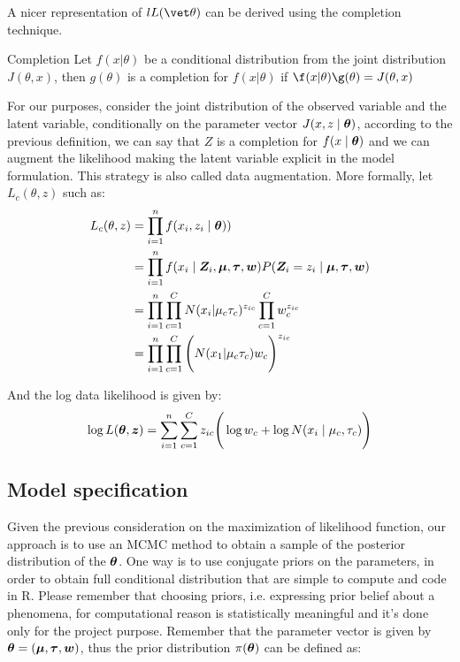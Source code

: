 \documentclass{article}
\begin{document}
A nicer representation of $l L(\vet \theta)$ can be derived using the completion technique.
\theoremstyle{definition}
\begin{definition}{Completion}
Let $f(x | \theta)$ be a conditional distribution from the joint distribution $J(\theta, x)$, then $g(\theta)$ is a completion for $f(x |\theta)$ if $\f(x|\theta) \g(\theta) = J(\theta,x)$
\end{definition}
For our purposes, consider the joint distribution of the observed variable and the latent variable, conditionally on the parameter vector $J(x, z \mid \boldsymbol{\theta})$, according to the previous definition, we can say that $Z$ is a completion for $f(x \mid \boldsymbol{\theta})$ and we can augment the likelihood making the latent variable explicit in the model formulation. This strategy is also called data augmentation. More formally, let $L_c(\theta, z)$ such as:
\begin{equation}
\begin{split}
L_c(\theta, z) &= \prod_{i=1}^n f(x_i, z_i \mid \boldsymbol{\theta})) \\
&= \prod_{i=1}^n f(x_i \mid  \boldsymbol{Z}_i, \boldsymbol{\mu}, \boldsymbol{\tau}, \boldsymbol{w}) P(\boldsymbol{Z}_i = z_i \mid \boldsymbol{\mu}, \boldsymbol{\tau}, \boldsymbol{w}) \\
&= \prod_{i=1}^n \prod_{c=1}^C N(x_i | \mu_c \tau_c)^{z_{ic}} \prod_{c=1}^C w_c^{z_{ic}} \\
&= \prod_{i=1}^n \prod_{c=1}^C \Bigg( N(x_1 | \mu_c \tau_c) w_c \Bigg)^{z_{ic}}
\end{split}
\end{equation}

And the log data likelihood is given by:
\begin{equation}
\log L(\boldsymbol{\theta}, \boldsymbol{z}) = \sum_{i=1}^n \sum_{c=1}^C z_{ic}\Bigg (\log w_c + \log N(x_i \mid \mu_c, \tau_c) \Bigg)
\end{equation}

\subsection{Model specification}
Given the previous consideration on the maximization of likelihood function, our approach is to use an MCMC method to obtain a sample of the posterior distribution of the $\boldsymbol{\theta}$. One way is to use conjugate priors on the parameters, in order to obtain full conditional distribution that are simple to compute and code in R. Please remember that choosing priors, i.e. expressing prior belief about a phenomena, for computational reason is statistically meaningful and it's done only for the project purpose.  Remember that the parameter vector is given by $\boldsymbol{\theta} = (\boldsymbol{\mu}, \boldsymbol{\tau}, \boldsymbol{w})$, thus the prior distribution $\pi(\boldsymbol{\theta})$ can be defined as:
\end{document}
